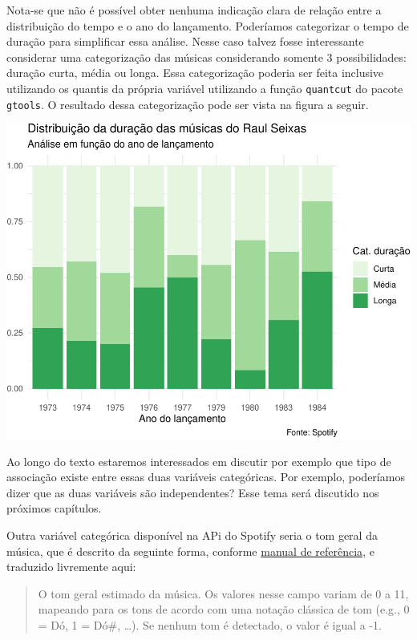 \documentclass[]{book}
\begin{document}
Nota-se que não é possível obter nenhuma indicação clara de relação entre a distribuição do tempo e o ano do lançamento. Poderíamos categorizar o tempo de duração para simplificar essa análise. Nesse caso talvez fosse interessante considerar uma categorização das músicas considerando somente 3 possibilidades: duração curta, média ou longa. Essa categorização poderia ser feita inclusive utilizando os quantis da própria variável utilizando a função \texttt{quantcut} do pacote \texttt{gtools}. O resultado dessa categorização pode ser vista na figura a seguir.

\begin{center}\includegraphics[width=0.8\linewidth]{notas_livro_files/figure-latex/graf2-1} \end{center}

Ao longo do texto estaremos interessados em discutir por exemplo que tipo de associação existe entre essas duas variáveis categóricas. Por exemplo, poderíamos dizer que as duas variáveis são independentes? Esse tema será discutido nos próximos capítulos.

Outra variável categórica disponível na APi do Spotify seria o tom geral da música, que é descrito da seguinte forma, conforme \href{https://developer.spotify.com/documentation/web-api/reference/tracks/get-audio-analysis/}{manual de referência}, e traduzido livremente aqui:

\begin{quote}
O tom geral estimado da música. Os valores nesse campo variam de 0 a 11, mapeando para os tons de acordo com uma notação clássica de tom (e.g., 0 = Dó, 1 = Dó\#, \ldots{}). Se nenhum tom é detectado, o valor é igual a -1.
\end{quote}
\end{document}
